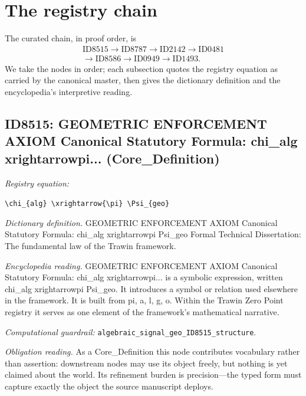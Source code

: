 \documentclass[11pt]{article}
\theoremstyle{remark}
\begin{document}
\section{The registry chain}
\label{sec:chain}

The curated chain, in proof order, is
\begin{equation*}
\begin{gathered}
\text{ID8515} \to \text{ID8787} \to \text{ID2142} \to \text{ID0481} \\
\to \text{ID8586} \to \text{ID0949} \to \text{ID1493}.
\end{gathered}
\end{equation*}
We take the nodes in order; each subsection quotes the registry equation as carried by the canonical master, then gives the dictionary definition and the encyclopedia's interpretive reading.

\subsection{ID8515: GEOMETRIC ENFORCEMENT AXIOM Canonical Statutory Formula: chi\_alg xrightarrowpi... (Core\_Definition)}

\noindent\textit{Registry equation:}\par
{\small\texttt{\textbackslash{}chi\_\{alg\} \textbackslash{}xrightarrow\{\textbackslash{}pi\} \textbackslash{}Psi\_\{geo\}}}\par\medskip
\noindent\textit{Dictionary definition.} GEOMETRIC ENFORCEMENT AXIOM Canonical Statutory Formula: chi\_alg xrightarrowpi Psi\_geo Formal Technical Dissertation: The fundamental law of the Trawin framework.\par\medskip
\noindent\textit{Encyclopedia reading.} GEOMETRIC ENFORCEMENT AXIOM Canonical Statutory Formula: chi\_alg xrightarrowpi... is a symbolic expression, written chi\_alg xrightarrowpi Psi\_geo. It introduces a symbol or relation used elsewhere in the framework. It is built from pi, a, l, g, o. Within the Trawin Zero Point registry it serves as one element of the framework's mathematical narrative.
\par\medskip\noindent\textit{Computational guardrail:} \texttt{algebraic\_signal\_geo\_ID8515\_structure}.
\par\medskip\noindent\textit{Obligation reading.} As a Core\_Definition this node contributes vocabulary rather than assertion: downstream nodes may use its object freely, but nothing is yet claimed about the world. Its refinement burden is precision---the typed form must capture exactly the object the source manuscript deploys.
\end{document}
